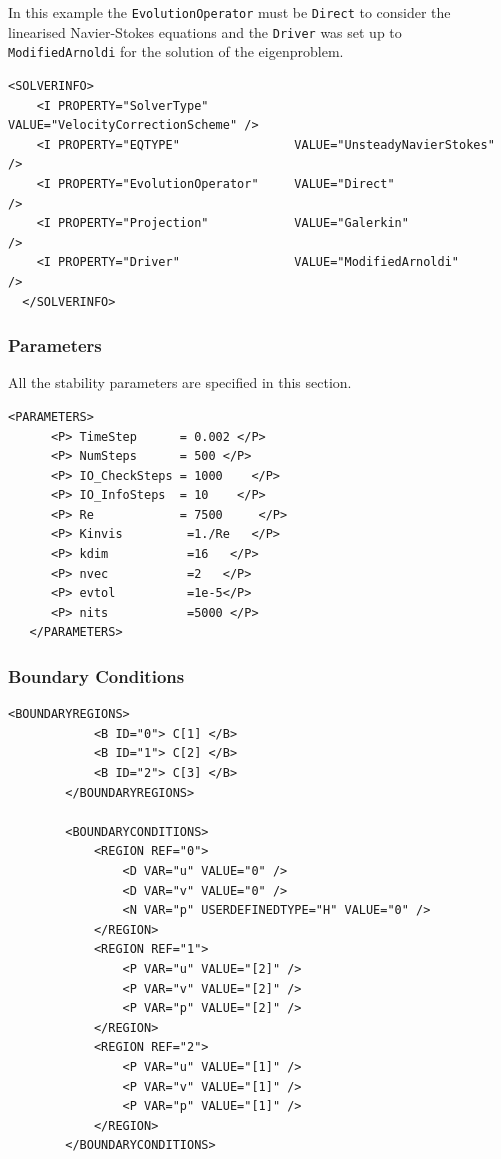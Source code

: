   In this example the \texttt{EvolutionOperator} must be \texttt{Direct} to consider the linearised Navier-Stokes equations and the \texttt{Driver} was set up to \texttt{ModifiedArnoldi} for the solution of the eigenproblem.

    \begin{lstlisting}[style=XMLStyle]
  <SOLVERINFO>
    <I PROPERTY="SolverType"            VALUE="VelocityCorrectionScheme" />
    <I PROPERTY="EQTYPE"                VALUE="UnsteadyNavierStokes"     />
    <I PROPERTY="EvolutionOperator"     VALUE="Direct"                   />
    <I PROPERTY="Projection"            VALUE="Galerkin"                 />
    <I PROPERTY="Driver"                VALUE="ModifiedArnoldi"         />
  </SOLVERINFO>
      \end{lstlisting}


\subsubsection{Parameters}

All the stability parameters are specified in this section.

    \begin{lstlisting}[style=XMLStyle]
<PARAMETERS>
      <P> TimeStep      = 0.002 </P>
      <P> NumSteps      = 500 </P>
      <P> IO_CheckSteps = 1000    </P>
      <P> IO_InfoSteps  = 10    </P>
      <P> Re            = 7500     </P>
      <P> Kinvis         =1./Re   </P>
      <P> kdim           =16   </P>
      <P> nvec           =2   </P>
      <P> evtol          =1e-5</P>
      <P> nits           =5000 </P>
   </PARAMETERS>
         \end{lstlisting}


\subsubsection{Boundary Conditions}

    \begin{lstlisting}[style=XMLStyle]
 <BOUNDARYREGIONS>
            <B ID="0"> C[1] </B>
            <B ID="1"> C[2] </B>
            <B ID="2"> C[3] </B>
        </BOUNDARYREGIONS>

        <BOUNDARYCONDITIONS>
            <REGION REF="0">
                <D VAR="u" VALUE="0" />
                <D VAR="v" VALUE="0" />
                <N VAR="p" USERDEFINEDTYPE="H" VALUE="0" />
            </REGION>
            <REGION REF="1">
                <P VAR="u" VALUE="[2]" />
                <P VAR="v" VALUE="[2]" />
                <P VAR="p" VALUE="[2]" />
            </REGION>
            <REGION REF="2">
                <P VAR="u" VALUE="[1]" />
                <P VAR="v" VALUE="[1]" />
                <P VAR="p" VALUE="[1]" />
            </REGION>
        </BOUNDARYCONDITIONS>
                 \end{lstlisting}

